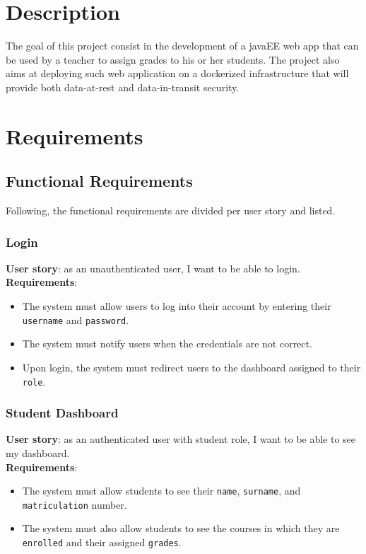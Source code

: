 \chapter{Description}

The goal of this project consist in the development of a javaEE web app that can be used by a teacher to assign grades to his or her students. The project also aims at deploying such web application on a dockerized infrastructure that will provide both data-at-rest and data-in-transit security.

\chapter{Requirements}

\section{Functional Requirements}

Following, the functional requirements are divided per user story and listed.

\subsection{Login}

\noindent\textbf{User story}: as an unauthenticated user, I want to be able to login.\\
\noindent\textbf{Requirements}:
\begin{itemize}
    \item The system must allow users to log into their account by entering their \texttt{username} and \texttt{password}.
    \item The system must notify users when the credentials are not correct.
    \item Upon login, the system must redirect users to the dashboard assigned to their \texttt{role}.
\end{itemize}

\subsection{Student Dashboard}

\noindent\textbf{User story}: as an authenticated user with student role, I want to be able to see my dashboard.\\
\noindent\textbf{Requirements}:
\begin{itemize}
    \item The system must allow students to see their \texttt{name}, \texttt{surname}, and \texttt{matriculation} number.
    \item The system must also allow students to see the courses in which they are \texttt{enrolled} and their assigned \texttt{grades}.
\end{itemize}

